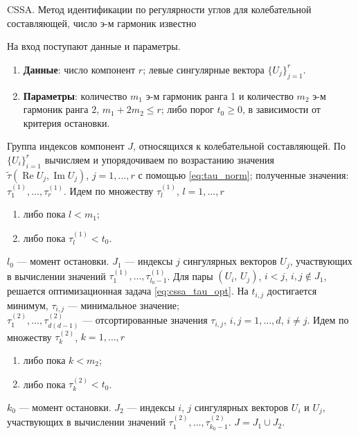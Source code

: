 \documentclass[specialist,
               substylefile = spbu.rtx,
               subf,href,colorlinks=true, 12pt]{disser}
\def\RE{\mathop{\mathrm{Re}}}
\def\IM{\mathop{\mathrm{Im}}}
\begin{document}
\begin{algorithm}[!hhh]
\caption{CSSA. Метод идентификации по регулярности углов для колебательной составляющей, число э-м гармоник известно}
\label{alg:cssatau_2}
\begin{algorithmic}[1]
\REQUIRE На вход поступают данные и параметры.
\begin{enumerate}
\item \textbf{Данные}: число компонент $r$; левые сингулярные вектора $\{U_j\}_{j=1}^{r}$.\\
\item \textbf{Параметры}:  количество $m_1$ э-м гармоник ранга 1 и количество $m_2$ э-м гармоник ранга 2, $m_1 + 2 m_2 \leqslant r$; либо порог $t_0 \geqslant 0$, в зависимости от критерия остановки.
\end{enumerate}
\ENSURE Группа индексов компонент $J$, относящихся к колебательной составляющей.
\STATE По $\{U_i\}_{i=1}^{r}$ вычисляем и упорядочиваем по возрастанию значения $\tilde{\tau}(\RE U_j, \IM U_j)$, $j=1,\ldots, r$ с помощью \eqref{eq:tau_norm}; полученные значения:  $\tau_1^{(1)}, \ldots, \tau_{r}^{(1)}$.
\STATE Идем по множеству $\tau_l^{(1)}$, $l=1,\ldots,r$
\begin{enumerate}
\item либо пока $l < m_1$;
\item либо пока $\tau_l^{(1)} < t_0$.
\end{enumerate}
$l_0$ --- момент остановки.
\STATE $J_1$ --- индексы $j$ сингулярных векторов $U_j$, участвующих в вычислении  значений $\tau_1^{(1)}, \ldots, \tau_{l_0 - 1}^{(1)}$.
\STATE Для пары $(U_i,\,U_j)$, $i<j$, $i,j \not \in J_1$, решается оптимизационная задача \eqref{eq:cssa_tau_opt}.
На $t_{i,j}$ достигается минимум, $\tau_{i,j}$ --- минимальное значение;\\
$\tau_1^{(2)}, \ldots, \tau_{d(d-1)}^{(2)}$ --- отсортированные значения $\tau_{i,j}$, $i,j=1,\ldots, d$, $i \not = j$.
\STATE Идем по множеству $\tau_k^{(2)}$, $k=1,\ldots,r$
\begin{enumerate}
\item либо пока $k < m_2$;
\item либо пока $\tau_k^{(2)} < t_0$.
\end{enumerate}
$k_0$ --- момент остановки.
\STATE $J_2$ --- индексы $i$, $j$ сингулярных векторов $U_i$ и $U_{j}$, участвующих в вычислении  значений $\tau_1^{(2)}, \ldots, \tau_{k_0 - 1}^{(2)}$.
\STATE $J = J_1 \cup J_2$.
\end{algorithmic}
\end{algorithm}
\end{document}
